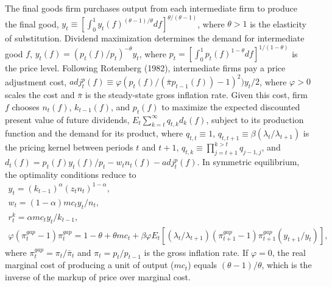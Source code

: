 \documentclass[12pt, final]{article}
\begin{document}
The final goods firm purchases output from each intermediate firm to produce the final good, $y_t \equiv [\int_{0}^1 y_t(f)^{(\theta-1)/\theta}df]^{\theta/(\theta-1)}$, where $\theta > 1$ is the elasticity of substitution. Dividend maximization determines the demand for intermediate good $f$, $y_t(f) = (p_t(f)/p_t)^{-\theta}y_t$, where $p_t = [\int_{0}^{1} p_t(f)^{1-\theta}df]^{1/(1-\theta)}$ is the price level. Following Rotemberg (1982), intermediate firms pay a price adjustment cost, $adj_t^p(f) \equiv \varphi(p_t(f)/(\bar{\pi}p_{t-1}(f))-1)^2)y_t/2$, where $\varphi > 0$ scales the cost and $\bar{\pi}$ is the steady-state gross inflation rate. Given this cost, firm $f$ chooses $n_t(f)$, $k_{t-1}(f)$, and $p_t(f)$ to maximize the expected discounted present value of future dividends, $E_t\sum_{k=t}^\infty q_{t,k}d_k(f)$, subject to its production function and the demand for its product, where $q_{t,t} \equiv 1$, $q_{t,t+1} \equiv \beta(\lambda_t/\lambda_{t+1})$ is the pricing kernel between periods $t$ and $t+1$, $q_{t,k} \equiv \prod_{j=t+1}^{k>t} q_{j-1,j}$, and $d_t(f) = p_t(f)y_t(f)/p_t - w_tn_t(f) - adj_t^p(f)$. In symmetric equilibrium, the optimality conditions reduce to
\begin{gather}
  y_t = (k_{t-1})^\alpha(z_tn_t)^{1-\alpha},\\
  w_t = (1-\alpha)mc_ty_t/n_t,\\
  r_t^k = \alpha mc_t y_t/k_{t-1},\\
  \varphi(\pi_t^{gap}-1)\pi_t^{gap} = 1-\theta + \theta mc_t + \beta\varphi E_t[(\lambda_t/\lambda_{t+1})(\pi_{t+1}^{gap}-1)\pi_{t+1}^{gap}(y_{t+1}/y_t)],
\end{gather}
where $\pi^{gap}_t = \pi_t/\bar{\pi}_t$ and $\pi_t = p_t/p_{t-1}$ is the gross inflation rate. If $\varphi = 0$, the real marginal cost of producing a unit of output ($mc_t$) equals $(\theta-1)/\theta$, which is the inverse of the markup of price over marginal cost.
\end{document}
